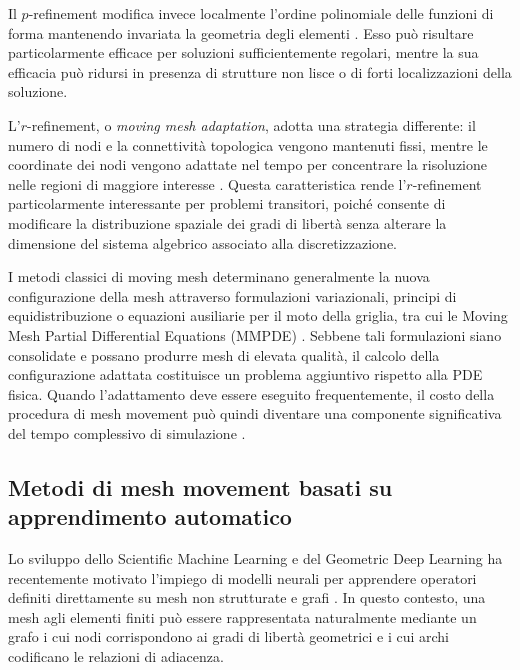 Il $p$-refinement modifica invece localmente l'ordine polinomiale delle funzioni di forma mantenendo invariata la geometria degli elementi \citep{szabo2021finite}. Esso può risultare particolarmente efficace per soluzioni sufficientemente regolari, mentre la sua efficacia può ridursi in presenza di strutture non lisce o di forti localizzazioni della soluzione.

L'$r$-refinement, o \textit{moving mesh adaptation}, adotta una strategia differente: il numero di nodi e la connettività topologica vengono mantenuti fissi, mentre le coordinate dei nodi vengono adattate nel tempo per concentrare la risoluzione nelle regioni di maggiore interesse \citep{huang2010adaptive,budd2009adaptivity,hyman1988moving}. Questa caratteristica rende l'$r$-refinement particolarmente interessante per problemi transitori, poiché consente di modificare la distribuzione spaziale dei gradi di libertà senza alterare la dimensione del sistema algebrico associato alla discretizzazione.

I metodi classici di moving mesh determinano generalmente la nuova configurazione della mesh attraverso formulazioni variazionali, principi di equidistribuzione o equazioni ausiliarie per il moto della griglia, tra cui le Moving Mesh Partial Differential Equations (MMPDE) \citep{huang2001practical,huang2010adaptive,budd2009adaptivity}. Sebbene tali formulazioni siano consolidate e possano produrre mesh di elevata qualità, il calcolo della configurazione adattata costituisce un problema aggiuntivo rispetto alla PDE fisica. Quando l'adattamento deve essere eseguito frequentemente, il costo della procedura di mesh movement può quindi diventare una componente significativa del tempo complessivo di simulazione \citep{song2022m2n,rowbottom2024g}.

\subsection{Metodi di mesh movement basati su apprendimento automatico}

Lo sviluppo dello Scientific Machine Learning e del Geometric Deep Learning ha recentemente motivato l'impiego di modelli neurali per apprendere operatori definiti direttamente su mesh non strutturate e grafi \citep{bronstein2021geometric,battaglia2018relational}. In questo contesto, una mesh agli elementi finiti può essere rappresentata naturalmente mediante un grafo i cui nodi corrispondono ai gradi di libertà geometrici e i cui archi codificano le relazioni di adiacenza.

